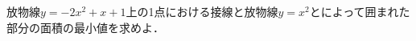 \documentclass[../../main.tex]{subfiles}
\begin{document}
放物線$y=-2x^2+x+1$上の1点における接線と放物線$y=x^2$とによって囲まれた部分の面積の最小値を求めよ．
\end{document}
